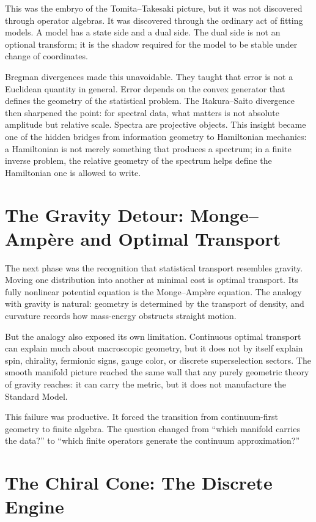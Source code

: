 This was the embryo of the Tomita--Takesaki picture, but it was not discovered
through operator algebras.  It was discovered through the ordinary act of fitting
models.  A model has a state side and a dual side.  The dual side is not an
optional transform; it is the shadow required for the model to be stable under
change of coordinates.

Bregman divergences made this unavoidable.  They taught that error is not a
Euclidean quantity in general.  Error depends on the convex generator that
defines the geometry of the statistical problem.  The Itakura--Saito divergence
then sharpened the point: for spectral data, what matters is not absolute
amplitude but relative scale.  Spectra are projective objects.  This insight
became one of the hidden bridges from information geometry to Hamiltonian
mechanics: a Hamiltonian is not merely something that produces a spectrum; in a
finite inverse problem, the relative geometry of the spectrum helps define the
Hamiltonian one is allowed to write.

\section{The Gravity Detour: Monge--Amp\`ere and Optimal Transport}

The next phase was the recognition that statistical transport resembles gravity.
Moving one distribution into another at minimal cost is optimal transport.  Its
fully nonlinear potential equation is the Monge--Amp\`ere equation.  The analogy
with gravity is natural: geometry is determined by the transport of density,
and curvature records how mass-energy obstructs straight motion.

But the analogy also exposed its own limitation.  Continuous optimal transport
can explain much about macroscopic geometry, but it does not by itself explain
spin, chirality, fermionic signs, gauge color, or discrete superselection
sectors.  The smooth manifold picture reached the same wall that any purely
geometric theory of gravity reaches: it can carry the metric, but it does not
manufacture the Standard Model.

This failure was productive.  It forced the transition from continuum-first
geometry to finite algebra.  The question changed from ``which manifold carries
the data?'' to ``which finite operators generate the continuum approximation?''

\section{The Chiral Cone: The Discrete Engine}

